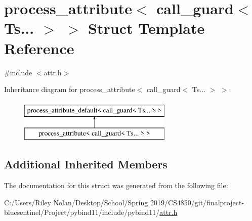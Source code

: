 \hypertarget{structprocess__attribute_3_01call__guard_3_01_ts_8_8_8_01_4_01_4}{}\section{process\+\_\+attribute$<$ call\+\_\+guard$<$ Ts... $>$ $>$ Struct Template Reference}
\label{structprocess__attribute_3_01call__guard_3_01_ts_8_8_8_01_4_01_4}


{\ttfamily \#include $<$attr.\+h$>$}

Inheritance diagram for process\+\_\+attribute$<$ call\+\_\+guard$<$ Ts... $>$ $>$\+:\begin{figure}[H]
\begin{center}
\leavevmode
\includegraphics[height=2.000000cm]{structprocess__attribute_3_01call__guard_3_01_ts_8_8_8_01_4_01_4}
\end{center}
\end{figure}
\subsection*{Additional Inherited Members}


The documentation for this struct was generated from the following file\+:\begin{DoxyCompactItemize}
\item 
C\+:/\+Users/\+Riley Nolan/\+Desktop/\+School/\+Spring 2019/\+C\+S4850/git/finalproject-\/bluesentinel/\+Project/pybind11/include/pybind11/\mbox{\hyperlink{attr_8h}{attr.\+h}}\end{DoxyCompactItemize}
